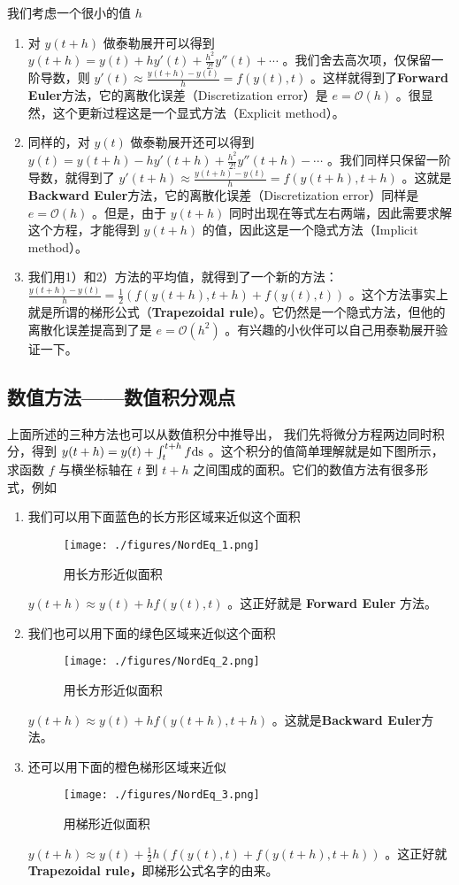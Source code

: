 我们考虑一个很小的值 $h$ 
\begin{enumerate}
\item 对 $y(t+h)$ 做泰勒展开可以得到 $y(t+h)=y(t)+hy'(t)+\frac{h^2}{2!}y''(t)+\cdots$ 。我们舍去高次项，仅保留一阶导数，则 $y'(t)\approx \frac{y(t+h)-y(t)}{h}= f(y(t),t)$ 。这样就得到了\textbf{Forward Euler}方法，它的离散化误差（Discretization error）是 $e=\mathcal{O}(h)$ 。很显然，这个更新过程这是一个显式方法（Explicit method）。
\item 同样的，对 $y(t)$ 做泰勒展开还可以得到 $y(t)=y(t+h)-hy'(t+h)+\frac{h^2}{2!}y''(t+h)-\cdots$ 。我们同样只保留一阶导数，就得到了 $y'(t+h)\approx \frac{y(t+h)-y(t)}{h}= f(y(t+h),t+h)$ 。这就是\textbf{Backward Euler}方法，它的离散化误差（Discretization error）同样是 $e=\mathcal{O}(h)$ 。但是，由于 $y(t+h)$ 同时出现在等式左右两端，因此需要求解这个方程，才能得到 $y(t+h)$ 的值，因此这是一个隐式方法（Implicit method）。
\item 我们用1）和2）方法的平均值，就得到了一个新的方法： $ \frac{y(t+h)-y(t)}{h}= \frac{1}{2}\left(f(y(t+h),t+h)+f(y(t),t)\right)$ 。这个方法事实上就是所谓的梯形公式（\textbf{Trapezoidal rule}）。它仍然是一个隐式方法，但他的离散化误差提高到了是 $e=\mathcal{O}(h^2)$ 。有兴趣的小伙伴可以自己用泰勒展开验证一下。
\end{enumerate}


\subsection{数值方法——数值积分观点}

上面所述的三种方法也可以从数值积分中推导出， 我们先将微分方程两边同时积分，得到 $y(t+h)=y(t)+\int_t^{t+h}f \rm{d}s$ 。这个积分的值简单理解就是如下图所示，求函数 $f$ 与横坐标轴在 $t$ 到 $t+h$ 之间围成的面积。它们的数值方法有很多形式，例如

\begin{enumerate}
\item 我们可以用下面蓝色的长方形区域来近似这个面积
\begin{figure}[ht]
\centering
\texttt{[image: ./figures/NordEq\_1.png]}
\caption{用长方形近似面积} \label{NordEq_fig1}
\end{figure}
$y(t+h)\approx y(t)+hf(y(t),t)$ 。这正好就是 \textbf{Forward Euler }方法。
\item 我们也可以用下面的绿色区域来近似这个面积
\begin{figure}[ht]
\centering
\texttt{[image: ./figures/NordEq\_2.png]}
\caption{用长方形近似面积} \label{NordEq_fig2}
\end{figure}
$y(t+h)\approx y(t)+hf(y(t+h),t+h)$ 。这就是\textbf{Backward Euler}方法。
\item 还可以用下面的橙色梯形区域来近似
\begin{figure}[ht]
\centering
\texttt{[image: ./figures/NordEq\_3.png]}
\caption{用梯形近似面积} \label{NordEq_fig3}
\end{figure}
$y(t+h)\approx y(t)+\frac{1}{2}h\left(f(y(t),t)+f(y(t+h),t+h)\right)$ 。这正好就\textbf{Trapezoidal rule，}即梯形公式名字的由来。
\end{enumerate}


